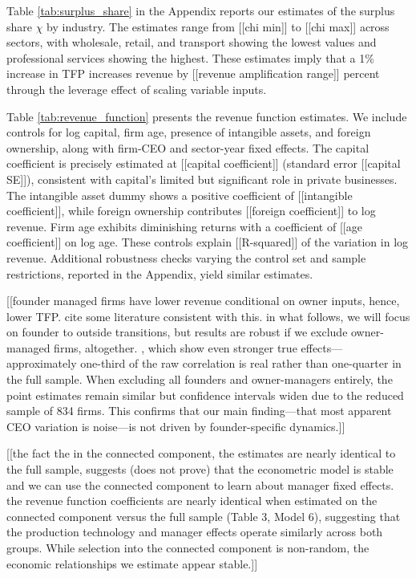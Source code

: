\documentclass[11pt,a4paper]{article}
\begin{document}
Table \ref{tab:surplus_share} in the Appendix reports our estimates of the surplus share $\chi$ by industry. The estimates range from [[chi min]] to [[chi max]] across sectors, with wholesale, retail, and transport showing the lowest values and professional services showing the highest. These estimates imply that a 1\% increase in TFP increases revenue by [[revenue amplification range]] percent through the leverage effect of scaling variable inputs.

Table \ref{tab:revenue_function} presents the revenue function estimates. We include controls for log capital, firm age, presence of intangible assets, and foreign ownership, along with firm-CEO and sector-year fixed effects. The capital coefficient is precisely estimated at [[capital coefficient]] (standard error [[capital SE]]), consistent with capital's limited but significant role in private businesses. The intangible asset dummy shows a positive coefficient of [[intangible coefficient]], while foreign ownership contributes [[foreign coefficient]] to log revenue. Firm age exhibits diminishing returns with a coefficient of [[age coefficient]] on log age. These controls explain [[R-squared]] of the variation in log revenue. Additional robustness checks varying the control set and sample restrictions, reported in the Appendix, yield similar estimates.

[[founder managed firms have lower revenue conditional on owner inputs, hence, lower TFP. cite some literature consistent with this. in what follows, we will focus on founder to outside transitions, but results are robust if we exclude owner-managed firms, altogether. , which show even stronger true effects—approximately one-third of the raw correlation is real rather than one-quarter in the full sample. When excluding all founders and owner-managers entirely, the point estimates remain similar but confidence intervals widen due to the reduced sample of 834 firms. This confirms that our main finding—that most apparent CEO variation is noise—is not driven by founder-specific dynamics.]]




[[the fact the in the connected component, the estimates are nearly identical to the full sample, suggests (does not prove) that the econometric model is stable and we can use the connected component to learn about manager fixed effects. the revenue function coefficients are nearly identical when estimated on the connected component versus the full sample (Table 3, Model 6), suggesting that the production technology and manager effects operate similarly across both groups. While selection into the connected component is non-random, the economic relationships we estimate appear stable.]]
\end{document}
